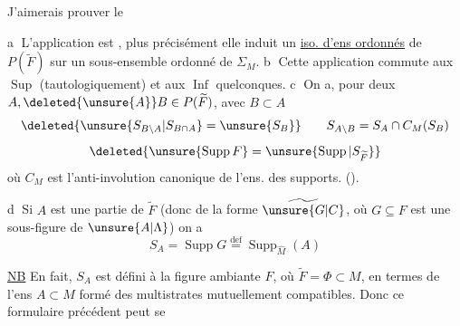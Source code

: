 
J'aimerais prouver le

\uline{} \textcircled{a} L'application  est , plus précisément elle induit un \uline{iso. d'ens ordonnés} de $P(\widetilde F)$ sur  un sous-ensemble ordonné de $\Sigma_M$. \textcircled{b} Cette application  commute aux $\operatorname{Sup}$  (tautologiquement) et aux $\operatorname{Inf}$ quelconques. \textcircled{c} On a, pour deux $A,\deleted{\unsure{A}}B\in P(\widetilde F)$, avec $B\subset A$
\[
\deleted{\unsure{S_{B\setminus A}|S_{B\cap A}}=\unsure{S_B}}
\qquad S_{A\setminus B}=S_A\cap C_M(S_B)
\]
\[
\deleted{\unsure{\operatorname{Supp}F}=\unsure{\operatorname{Supp}|S_{\widetilde F}}}
\]
où $C_M$ est l'anti-involution canonique de l'ens. des supports. ().

\textcircled{d}  Si $A$ est une partie  de $\widetilde F$ (donc de la forme $\widetilde{\unsure{G|C}}$, où $G\subseteq F$ est une sous-figure de $\unsure{A|\Lambda}$) on a
\[
S_A=\operatorname{Supp}G\overset{\mathrm{def}}=\operatorname{Supp}_{\widehat M}(A)
\]

\uline{NB} En fait, $S_A$ est défini  à la figure ambiante \deleted{\unsure{\(\Phi\)}} $F$, où $\widetilde F=\Phi\subset M$, en termes de l'ens $A\subset M$ formé des multistrates mutuellement compatibles. Donc  ce formulaire précédent peut se
